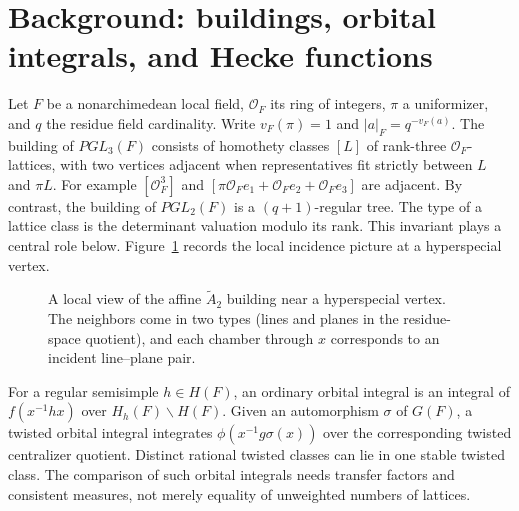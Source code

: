 \documentclass[12pt,letterpaper]{amsart}
\numberwithin{equation}{section}
\theoremstyle{definition}
\theoremstyle{plain}
\begin{document}
\section{Background: buildings, orbital integrals, and Hecke functions}
\label{sec:revisit-background}

Let $F$ be a nonarchimedean local field, $\mathcal O_F$ its ring of
integers, $\pi$ a uniformizer, and $q$ the residue field cardinality.
Write $v_F(\pi)=1$ and $|a|_F=q^{-v_F(a)}$.
The building of $PGL_3(F)$ consists of homothety classes $[L]$ of
rank-three $\mathcal O_F$-lattices, with two vertices adjacent
when representatives fit strictly between $L$ and $\pi L$.
For example $[\mathcal O_F^3]$ and
$[\pi\mathcal O_Fe_1+\mathcal O_Fe_2+\mathcal O_Fe_3]$
are adjacent. By contrast, the building of $PGL_2(F)$ is a
$(q+1)$-regular tree. The type of a lattice class is the determinant
valuation modulo its rank. This invariant plays a central role below. Figure~\ref{fig:new-local-link} records the local incidence picture at a hyperspecial vertex.


\begin{figure}[htbp]
\centering
{}
\caption{A local view of the affine $\widetilde A_2$ building near a hyperspecial vertex. The neighbors come in two types (lines and planes in the residue-space quotient), and each chamber through $x$ corresponds to an incident line--plane pair.\label{fig:new-local-link}}
\end{figure}


For a regular semisimple $h\in H(F)$, an ordinary orbital integral is
an integral of $f(x^{-1}hx)$ over $H_h(F)\backslash H(F)$.
Given an automorphism $\sigma$ of $G(F)$, a twisted orbital integral
integrates $\phi(x^{-1}g\sigma(x))$ over the corresponding twisted
centralizer quotient. Distinct rational twisted classes can lie in one
stable twisted class. The comparison of such orbital integrals needs
transfer factors and consistent measures, not merely equality of
unweighted numbers of lattices.
\end{document}
